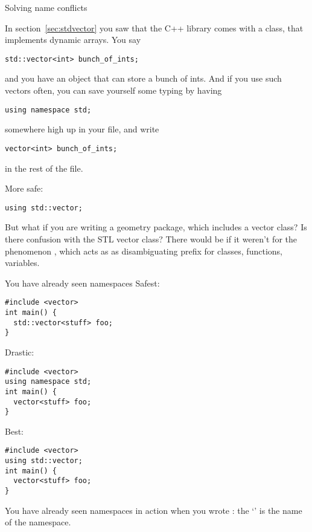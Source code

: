 
 {Solving name conflicts}

In section~\ref{sec:stdvector} you saw that the C++ library comes with
a  class, that implements dynamic arrays. You say
\begin{verbatim}
std::vector<int> bunch_of_ints;
\end{verbatim}
and you have an object that can store a bunch of ints. And if you use
such vectors often, you can save yourself some typing by having
\begin{verbatim}
using namespace std;
\end{verbatim}
somewhere high up in your file, and write
\begin{verbatim}
vector<int> bunch_of_ints;
\end{verbatim}
in the rest of the file.

More safe:
\begin{verbatim}
using std::vector;
\end{verbatim}

But what if you are writing a geometry package, which includes a
vector class? Is there confusion with the \ac{STL} vector class?
There would be if it weren't for the phenomenon
, which acts as as disambiguating prefix for
classes, functions, variables.

\begin{slide}{You have already seen namespaces}
  \label{sl:vec-namespace}
  Safest:
\begin{verbatim}
#include <vector>
int main() {
  std::vector<stuff> foo;
}
\end{verbatim}
Drastic:
\begin{verbatim}
#include <vector>
using namespace std;
int main() {
  vector<stuff> foo;
}
\end{verbatim}
Best:
\begin{verbatim}
#include <vector>
using std::vector;
int main() {
  vector<stuff> foo;
}
\end{verbatim}
\end{slide}

You have already seen namespaces in action when you wrote
: the `' is the name of the namespace.

